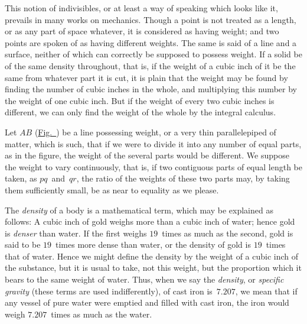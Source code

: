 \documentclass[12pt]{book}[2005/09/16]
\newcommand{\Fig}[2][Fig.]{\hyperref[fig:#2]{#1~{\upshape #2}}}
\newcommand{\Pagelabel}[1]{\phantomsection\label{page:#1}}
\newcommand{\PageSep}[1]{\Pagelabel{#1}\ignorespaces}
\renewcommand{\(}{{\upshape(}}
\renewcommand{\)}{{\upshape)}}
\begin{document}
This notion of indivisibles, or at least a way of
speaking which looks like it, prevails in many works
on mechanics. Though a point is not treated as a
length, or as any part of space whatever, it is considered
as having weight; and two points are spoken of
as having different weights. The same is said of a
line and a surface, neither of which can correctly be
supposed to possess weight. If a solid be of the same
density throughout, that is, if the weight of a cubic
inch of it be the same from whatever part it is cut, it
is plain that the weight may be found by finding the
number of cubic inches in the whole, and multiplying
this number by the weight of one cubic inch. But if
the weight of every two cubic inches is different, we
can only find the weight of the whole by the integral
calculus.

Let $AB$ (\Fig{11}) be a line possessing weight, or
%
a very thin parallelepiped of matter, which is such,
that if we were to divide it into any number of equal
parts, as in the figure, the weight of the several parts
would be different. We suppose the weight to vary
continuously, that is, if two contiguous parts of equal
length be taken, as $pq$~and~$qr$, the ratio of the weights
\PageSep{130}
of these two parts may, by taking them sufficiently
small, be as near to equality as we please.

The \emph{density} of a body is a mathematical term, which
%
%
may be explained as follows: A cubic inch of gold
weighs more than a cubic inch of water; hence gold
is \emph{denser} than water. If the first weighs $19$~times as
much as the second, gold is said to be $19$~times more
dense than water, or the density of gold is $19$~times
that of water. Hence we might define the density by
the weight of a cubic inch of the substance, but it is
usual to take, not this weight, but the proportion
which it bears to the same weight of water. Thus,
when we say the \emph{density}, or \emph{specific gravity} (these terms
are used indifferently), of cast iron is~$7.207$, we mean
%
%
that if any vessel of pure water were emptied and
filled with cast iron, the iron would weigh $7.207$~times
as much as the water.
\end{document}
